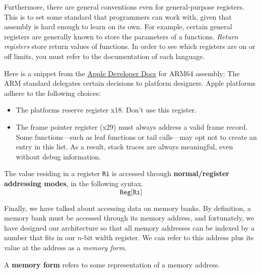   Furthermore, there are general conventions even for general-purpose registers. This is to set some standard that programmers can work with, given that assembly is hard enough to learn on its own.  For example, certain general registers are generally known to store the parameters of a functions. \textit{Return registers} store return values of functions. In order to see which registers are on or off limits, you must refer to the documentation of each language. 

  \begin{example}
    Here is a snippet from the \href{https://developer.apple.com/documentation/xcode/writing-arm64-code-for-apple-platforms}{Apple Developer Docs} for ARM64 assembly: The ARM standard delegates certain decisions to platform designers. Apple platforms adhere to the following choices:
    \begin{itemize}
      \item The platforms reserve register x18. Don’t use this register.
      \item The frame pointer register (x29) must always address a valid frame record. Some functions---such as leaf functions or tail calls---may opt not to create an entry in this list. As a result, stack traces are always meaningful, even without debug information.
    \end{itemize}
  \end{example}

  \begin{definition}
    The value residing in a register \texttt{Ri} is accessed through \textbf{normal/register addressing modes}, in the following syntax. 
    \begin{equation}
      \texttt{Reg[Ri]}
    \end{equation}
  \end{definition}

  Finally, we have talked about accessing data on memory banks. By definition, a memory bank must be accessed through its memory address, and fortunately, we have designed our architecture so that all memory addresses can be indexed by a number that fits in our $n$-bit width register. We can refer to this address plus its value at the address as a \textit{memory form}. 

  \begin{definition}
    A \textbf{memory form} refers to some representation of a memory address. 
  \end{definition}


